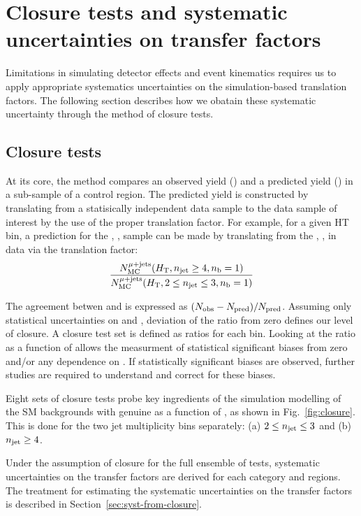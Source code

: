 \clearpage
\section{Closure tests and systematic uncertainties on transfer factors\label{sec:bkgd-syst}}

Limitations in simulating detector effects and event kinematics 
requires us to apply appropriate systematics uncertainties 
on the simulation-based translation factors.  The following section 
describes how we obatain these systematic uncertainty through the 
method of closure tests.

\subsection{Closure tests\label{sec:closure-tests-desc}}

At its core, the method compares an observed yield (\nobs) and a predicted
yield (\npre) in a sub-sample of a control region.  The predicted yield is constructed
by translating from a statisically independent data sample to the data sample of
interest by the use of the proper translation factor.  For example, for a given HT bin,
a prediction for the \njethigh, , \mj sample can be made by translating from the
\njetlow, , \mj in data via the translation factor: 
\begin{equation}
  \label{equ:tf-ratio-closure}
  \frac{N_{\rm MC}^{\rm \mu + jets}(\mbox{$H_\text{T}$},n_{\text{jet}} \geq 4, n_{\text{b}}=1)}{N_{\rm MC}^{\rm \mu + jets}(\mbox{$H_\text{T}$},2 \leq n_{\text{jet}} \leq 3,n_{\text{b}}=1)} 
\end{equation}

The agreement betwen \nobs and \npre is expressed as $(N_{\textrm{obs}} - N_{\textrm{pred}})/N_{\textrm{pred}}$.
Assuming only statistical uncertainties on \nobs and \npre, deviation of the 
ratio from zero defines our level of closure. A closure test set is defined
as ratios for each \scalht bin. Looking at the ratio as a function
of \scalht allows the measurment of statistical significant biases from zero and/or 
any dependence on \scalht.  If statistically significant biases
are observed, further studies are required to understand and correct
for these biases.

Eight sets of closure tests probe key ingredients of the simulation modelling 
of the SM backgrounds with genuine \met as a function of \scalht, as shown in
Fig.~\ref{fig:closure}. This is done for the two jet multiplicity bins
separately: (a) $2 \leq n_{\text{jet}} \leq 3$ and (b) $n_{\text{jet}} \geq 4$.

Under the assumption of closure for the full ensemble of tests,
systematic uncertainties on the transfer factors are derived for each
\njet category and \scalht regions. The treatment for
estimating the systematic uncertainties on the transfer factors is
described in Section~\ref{sec:syst-from-closure}.

